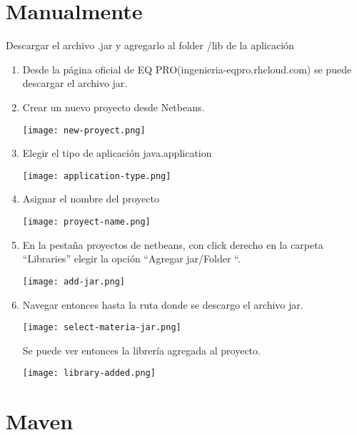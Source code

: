 	\section{Manualmente}\label{sec:manualInstall}
		Descargar el archivo .jar y agregarlo al folder /lib de la aplicación
		\begin{enumerate}
			\item Desde la página oficial de EQ PRO(ingenieria-eqpro.rhcloud.com) se puede descargar el archivo jar.

			\item Crear un nuevo proyecto desde Netbeans.

			\begin{center}
			  \texttt{[image: new-proyect.png]}
			\end{center}

			\item Elegir el tipo de aplicación java.application 
			\begin{center}
			  \texttt{[image: application-type.png]} 
			\end{center}
			\item Asignar el nombre del proyecto 
			\begin{center}
			  \texttt{[image: proyect-name.png]} 
			\end{center}
			\item En la pestaña proyectos de netbeans, con click derecho en la carpeta “Libraries” elegir la opción “Agregar jar/Folder “.
			\begin{center}
			  \texttt{[image: add-jar.png]} 
			\end{center}


			 \item Navegar entonces hasta la ruta donde se descargo el archivo jar. 

			\begin{center}
			  \texttt{[image: select-materia-jar.png]} 
			\end{center}

			Se puede ver entonces la librería agregada al proyecto.

			\begin{center}
			  \texttt{[image: library-added.png]} 
			\end{center}
		\end{enumerate}

	\section{Maven}

